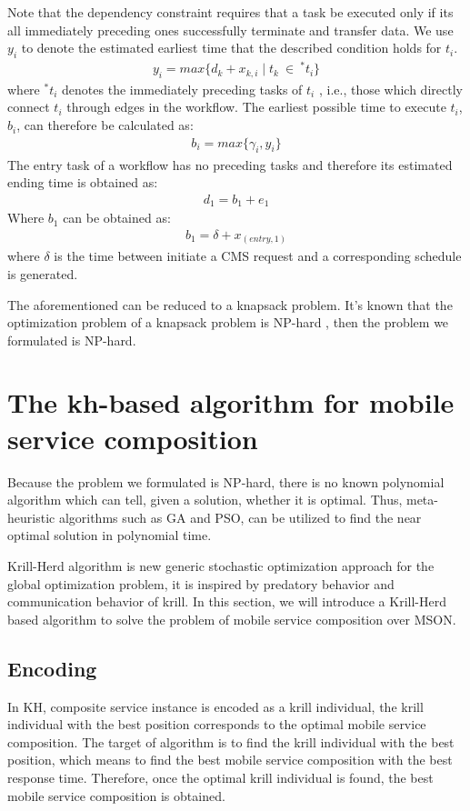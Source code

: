 \documentclass[journal]{IEEEtran}
\begin{document}
Note that the dependency constraint requires that a task be executed only if its all immediately preceding ones successfully terminate and transfer data. We use $y_i$ to denote the estimated earliest time that the described condition holds for $t_i$.
\begin{align}
y_i = max \{d_k + x_{k,i} \mid t_k \ \in \ ^{*}t_i \} 
\end{align}
where $^{*}t_i$ denotes the immediately preceding tasks of $t_i$ , i.e., those which directly connect $t_i$ through edges in the workflow.
The earliest possible time to execute $t_i$, $b_i$, can therefore be calculated as:
\begin{align}
b_i = max \{ \gamma_i, y_i \}
\end{align}
The entry task of a workflow has no preceding tasks and therefore its estimated ending time is obtained as:
\begin{align}
d_1 = b_1 + e_1
\end{align}
Where $b_1$ can be obtained as:
\begin{align}
b_1 = \delta + x_{(entry, 1)}
\end{align}
where $\delta$ is the time between initiate a CMS request and a corresponding schedule is generated.

The aforementioned can be reduced to a knapsack problem. It's known that the optimization problem of a knapsack problem is NP-hard \cite{papadimitriou1998combinatorial}, then the problem we formulated is NP-hard.


\section{The kh-based algorithm for mobile service composition}
Because the problem we formulated is NP-hard, there is no known polynomial algorithm which can tell, given a solution, whether it is optimal. Thus, meta-heuristic algorithms such as GA and PSO, can be utilized to find the near optimal solution in polynomial time.

Krill-Herd algorithm \cite{gandomi2012krill} is new generic stochastic optimization approach for the global optimization problem, it is inspired by predatory behavior and communication behavior of krill. 
In this section, we will introduce a Krill-Herd based algorithm to solve the problem of mobile service composition over MSON.

\subsection{Encoding}
In KH, composite service instance is encoded as a krill individual, the krill individual with the best position corresponds to the optimal mobile service composition. The target of algorithm is to find the krill individual with the best position, which means to find the best mobile service composition with the best response time. Therefore, once the optimal krill individual is found, the best mobile service composition is obtained.
\end{document}
